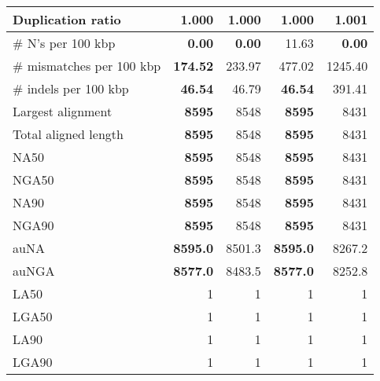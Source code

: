 \documentclass[12pt,a4paper]{article}
\begin{document}
\begin{table}[ht]
\begin{center}
\begin{tabular}{|l*{4}{|r}|}
Duplication ratio & {\bf 1.000} & {\bf 1.000} & {\bf 1.000} & 1.001 \\ \hline
\# N's per 100 kbp & {\bf 0.00} & {\bf 0.00} & 11.63 & {\bf 0.00} \\ \hline
\# mismatches per 100 kbp & {\bf 174.52} & 233.97 & 477.02 & 1245.40 \\ \hline
\# indels per 100 kbp & {\bf 46.54} & 46.79 & {\bf 46.54} & 391.41 \\ \hline
Largest alignment & {\bf 8595} & 8548 & {\bf 8595} & 8431 \\ \hline
Total aligned length & {\bf 8595} & 8548 & {\bf 8595} & 8431 \\ \hline
NA50 & {\bf 8595} & 8548 & {\bf 8595} & 8431 \\ \hline
NGA50 & {\bf 8595} & 8548 & {\bf 8595} & 8431 \\ \hline
NA90 & {\bf 8595} & 8548 & {\bf 8595} & 8431 \\ \hline
NGA90 & {\bf 8595} & 8548 & {\bf 8595} & 8431 \\ \hline
auNA & {\bf 8595.0} & 8501.3 & {\bf 8595.0} & 8267.2 \\ \hline
auNGA & {\bf 8577.0} & 8483.5 & {\bf 8577.0} & 8252.8 \\ \hline
LA50 & 1 & 1 & 1 & 1 \\ \hline
LGA50 & 1 & 1 & 1 & 1 \\ \hline
LA90 & 1 & 1 & 1 & 1 \\ \hline
LGA90 & 1 & 1 & 1 & 1 \\ \hline
\end{tabular}
\end{center}
\end{table}
\end{document}
